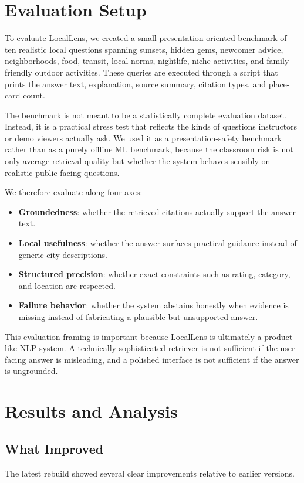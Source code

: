 \documentclass[11pt]{article}
\begin{document}
\section{Evaluation Setup}
To evaluate LocalLens, we created a small presentation-oriented benchmark of ten realistic local questions spanning sunsets, hidden gems, newcomer advice, neighborhoods, food, transit, local norms, nightlife, niche activities, and family-friendly outdoor activities. These queries are executed through a script that prints the answer text, explanation, source summary, citation types, and place-card count.

The benchmark is not meant to be a statistically complete evaluation dataset. Instead, it is a practical stress test that reflects the kinds of questions instructors or demo viewers actually ask. We used it as a presentation-safety benchmark rather than as a purely offline ML benchmark, because the classroom risk is not only average retrieval quality but whether the system behaves sensibly on realistic public-facing questions.

We therefore evaluate along four axes:
\begin{itemize}[leftmargin=*]
    \item \textbf{Groundedness}: whether the retrieved citations actually support the answer text.
    \item \textbf{Local usefulness}: whether the answer surfaces practical guidance instead of generic city descriptions.
    \item \textbf{Structured precision}: whether exact constraints such as rating, category, and location are respected.
    \item \textbf{Failure behavior}: whether the system abstains honestly when evidence is missing instead of fabricating a plausible but unsupported answer.
\end{itemize}

This evaluation framing is important because LocalLens is ultimately a product-like NLP system. A technically sophisticated retriever is not sufficient if the user-facing answer is misleading, and a polished interface is not sufficient if the answer is ungrounded.

\section{Results and Analysis}
\subsection{What Improved}
The latest rebuild showed several clear improvements relative to earlier versions.
\end{document}
